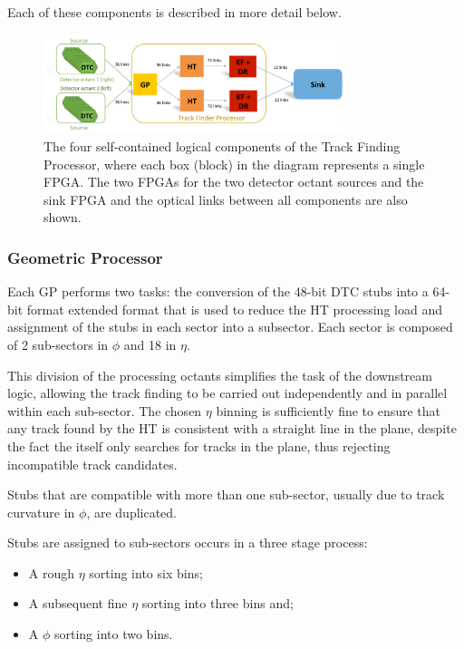 Each of these components is described in more detail below.

\begin{figure}[h]
\centering
\includegraphics[width=0.78\textwidth]{figs/tk-upgrade/demoslice1.pdf}
\caption{The four self-contained logical components of the Track Finding Processor, where each box (block) in the diagram represents a single FPGA. The two FPGAs for the two detector octant sources and the sink FPGA and the optical links between all components are also shown.}
\label{fig:TFP}
\end{figure}

\subsubsection{Geometric Processor}\label{subsubsec:GP}
Each GP performs two tasks: the conversion of the 48-bit DTC stubs into a 64-bit format extended format that is used to reduce the HT processing load and assignment of the stubs in each sector into a subsector. 
Each sector is composed of 2 sub-sectors in $\phi$ and 18 in $\eta$.

This division of the processing octants simplifies the task of the downstream logic, allowing the track finding to be carried out independently and in parallel within each sub-sector. 
The chosen $\eta$ binning is sufficiently fine to ensure that any track found by the \rphi HT is consistent with a straight line in the \rz plane, despite the fact the \HT itself only searches for tracks in the \rphi plane, thus rejecting incompatible track candidates.

Stubs that are compatible with more than one sub-sector, usually due to track curvature in $\phi$, are duplicated. 

Stubs are assigned to sub-sectors occurs in a three stage process:
\begin{itemize}
\item A rough $\eta$ sorting into six bins;
\item A subsequent fine $\eta$ sorting into three bins and;
\item A $\phi$ sorting into two bins. 
\end{itemize}

